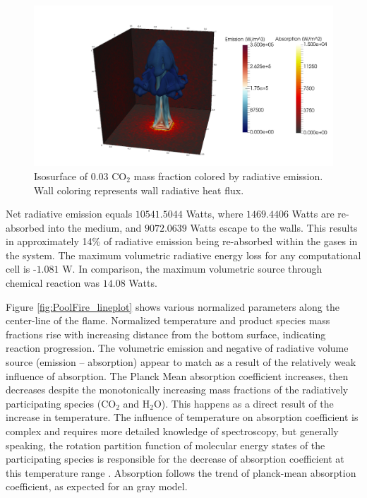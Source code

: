 \begin{figure}
\includegraphics[width=\linewidth]{figures/ch4/radiation_contours.png}
\caption{Isosurface of 0.03 CO$_2$ mass fraction colored by radiative emission. Wall coloring represents wall radiative heat flux.}
\label{fig:PoolFire_radiationcontours}
\end{figure}

Net radiative emission equals $10541.5044$ Watts, where $1469.4406$ Watts are re-absorbed into the medium, and $9072.0639$ Watts escape to the walls. This results in approximately 14\% of radiative emission being re-absorbed within the gases in the system. 
The maximum volumetric radiative energy loss for any computational cell is -$1.081$ W. In comparison, the maximum volumetric source through chemical reaction was $14.08$ Watts.

Figure \ref{fig:PoolFire_lineplot} shows various normalized parameters along the center-line of the flame. 
Normalized temperature and product species mass fractions rise with increasing distance from the bottom surface, indicating reaction progression. 
The volumetric emission and negative of radiative volume source (emission – absorption) appear to match as a result of the relatively weak influence of absorption.
The Planck Mean absorption coefficient increases, then decreases despite the monotonically increasing mass fractions of the radiatively participating species (CO$_2$ and H$_2$O). This happens as a direct result of the increase in temperature. 
The influence of temperature on absorption coefficient is complex and requires more detailed knowledge of spectroscopy, but generally speaking, the rotation partition function of molecular energy states of the participating species is responsible for the decrease of absorption coefficient at this temperature range \cite{Modest2013RadiativeTransfer}.
Absorption follows the trend of planck-mean absorption coefficient, as expected for an gray model.


